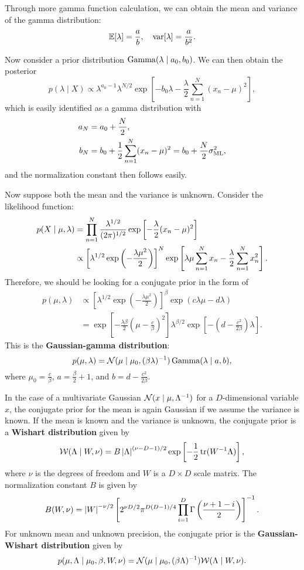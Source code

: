 \documentclass[a4paper]{article}
\begin{document}
Through more gamma function calculation, we can 
obtain the mean and variance of the gamma distribution:
\[
\mathbb{E}[\lambda] = \frac{a}{b}, 
\quad 
\operatorname{var}[\lambda] = \frac{a}{b^2}.
\]

Now consider a prior distribution $\operatorname{Gamma}(\lambda 
\mid a_0, b_0)$. We can then obtain the posterior
\[
p(\lambda \mid X) 
\propto \lambda^{a_0 - 1} \lambda^{N / 2} 
\exp \left[ - b_0 \lambda - \frac{\lambda}{2} 
\sum_{n=1}^N (x_n - \mu)^2 \right],
\]
which is easily identified as a gamma distribution with 
\[
\begin{aligned}
a_N &= a_0 + \frac{N}{2}, \\
b_N &= b_0 + \frac{1}{2} \sum_{n=1}^N (x_n - \mu)^2
= b_0 + \frac{N}{2} \sigma_{\text{ML}}^2,
\end{aligned}
\]
and the normalization constant then follows easily.

Now suppose both the mean and the variance is unknown.
Consider the likelihood function: 
\[
\begin{aligned}
p(X \mid \mu, \lambda)
&= \prod_{n=1}^N \frac{\lambda^{1 / 2}}{(2 \pi)^{1 / 2}}
\exp \left[ - \frac{\lambda}{2} (x_n - \mu)^2 \right] \\
&\propto \left[ \lambda^{1 / 2} \exp \left( - 
\frac{\lambda \mu^2}{2} \right) \right]^{N}
\exp \left[ \lambda \mu \sum_{n=1}^N x_n 
- \frac{\lambda}{2} \sum_{n=1}^N x_n^2 \right].
\end{aligned}
\]
Therefore, we should be looking for a conjugate prior 
in the form of 
\[
\begin{aligned}
p(\mu, \lambda)
&\propto \left[ \lambda^{1 / 2} \exp \left( - \frac{\lambda \mu^2}
{2} \right) \right]^\beta \exp \left( c \lambda \mu - 
d \lambda \right) \\
&= \exp \left[ - \frac{\lambda \beta}{2} 
\left( \mu - \frac{c}{\beta} \right)^2 \right]
\lambda^{\beta / 2} \exp \left[ - \left( d - 
\frac{c^2}{2 \beta} \right) \lambda \right].
\end{aligned}
\]
This is the \textbf{Gaussian-gamma distribution}: 
\[
p(\mu, \lambda) 
= \mathcal{N} (\mu \mid \mu_0, (\beta \lambda)^{-1}) 
\operatorname{Gamma} (\lambda \mid a, b),
\]
where $\mu_0 = \frac{c}{\beta}$, $a = \frac{\beta}{2} + 1$,
and $b = d - \frac{c^2}{2 \beta}$. 

In the case of a multivariate Gaussian $\mathcal{N} (x \mid \mu, 
\Lambda^{-1})$ for a $D$-dimensional variable $x$, 
the conjugate prior for the mean is again Gaussian
if we assume the variance is known. If the mean is 
known and the variance is unknown, the conjugate prior
is a \textbf{Wishart distribution} given by 
\[
\mathcal{W} (\Lambda \mid W, \nu)
= B \left\lvert \Lambda\right\rvert^{(\nu - D - 1) / 2} 
\exp \left[ -\frac{1}{2} \operatorname{tr} (W^{-1} \Lambda) \right],
\]
where $\nu$ is the degrees of freedom and $W$ is a 
$D \times D$ scale matrix. The normalization constant 
$B$ is given by 
\[
B(W, \nu) = \left\lvert W\right\rvert^{- \nu / 2} 
\left[ 2^{\nu D / 2} \pi^{D (D - 1) / 4} 
\prod_{i=1}^D \Gamma \left( \frac{\nu + 1 - i}{2} \right) 
\right]^{-1}.
\]
For unknown mean and unknown precision, the conjugate
prior is the \textbf{Gaussian-Wishart distribution} 
given by 
\[
p(\mu, \Lambda \mid \mu_0, \beta, W, \nu) 
= \mathcal{N} (\mu \mid \mu_0, (\beta \Lambda)^{-1}) 
\mathcal{W} (\Lambda \mid W, \nu).
\]
\end{document}
